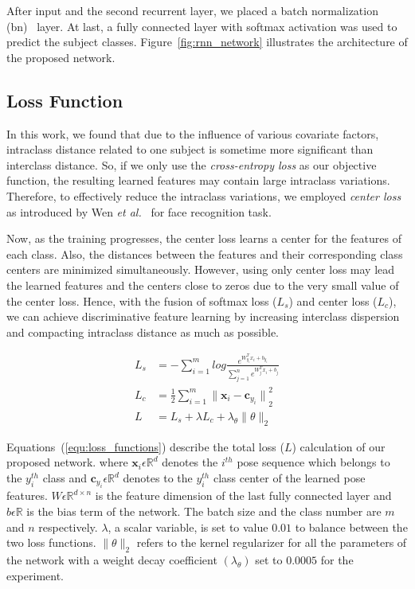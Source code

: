 After input and the second recurrent layer, we placed a batch normalization (\gls{bn})~\cite{Ioffe_15} layer. At last, a fully connected layer with softmax activation was used to predict the subject classes. Figure~\ref{fig:rnn_network} illustrates the architecture of the proposed network. 


\subsection{Loss Function}
In this work, we found that due to the influence of various covariate factors, intraclass distance related to one subject is sometime more significant than interclass distance. So, if we only use the \textit{cross-entropy loss} as our objective function, the resulting learned features may contain large intraclass variations. Therefore, to effectively reduce the intraclass variations, we employed \textit{center loss} as introduced by Wen \textit{et al.}~\cite{Wen_16} for face recognition task. 

Now, as the training progresses, the center loss learns a center for the features of each class. Also, the distances between the features and their corresponding class centers are minimized simultaneously. However, using only center loss may lead the learned features and the centers close to zeros due to the very small value of the center loss. Hence, with the fusion of softmax loss ($L_s$) and center loss ($L_c$), we can achieve discriminative feature learning by increasing interclass dispersion and compacting intraclass distance as much as possible.


\begin{equation} \label{equ:loss_functions}
\begin{split}
L_s &=-\sum_{i=1}^{m}log{\frac{e^{W_{y_i}^{T}x_i + b_{y_i}}}{\sum_{j=1}^{n}{e^{W_{j}^{T}x_i+ b_j}}}} \\
L_c &= \frac{1}{2}\sum_{i=1}^{m}{\parallel{{\boldsymbol x_i}-{\boldsymbol c_{y_i}}}\parallel}_2^2 \\
L &= L_s + \lambda L_c + \lambda_{\theta}\parallel{\theta}\parallel_{2}
\end{split} 
\end{equation}

Equations~(\ref{equ:loss_functions}) describe the total loss ($ L $) calculation of our proposed network. where $\boldsymbol x_{i} \epsilon \mathbb {R}^d$ denotes the $i^{th}$ pose sequence which belongs to the $y_i^{th}$ class and  $\boldsymbol c_{y_i} \epsilon \mathbb {R}^d$ denotes to the $y_i^{th}$ class center of the learned pose features. $W \epsilon \mathbb {R}^{d\times n}$ is the feature dimension of the last fully connected layer and $b\epsilon \mathbb {R}$ is the bias term of the network. The batch size and the class number are $ m $ and $ n $ respectively. $\lambda$, a scalar variable, is set to value $ 0.01 $ to balance between the two loss functions. $\parallel{\theta}\parallel_{2}$ refers to the kernel regularizer for all the parameters of the network with a weight decay coefficient $(\lambda_{\theta})$ set to $0.0005$ for the experiment.  



